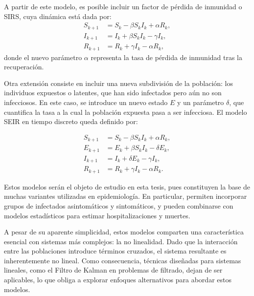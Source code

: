 A partir de este modelo, es posible incluir un factor de pérdida de inmunidad o SIRS, cuya dinámica está dada por:
\begin{equation}
    \begin{aligned}
    S_{k+1} &= S_k -\beta S_k I_k + \alpha R_k, \\
    I_{k+1} &= I_k + \beta S_k I_k - \gamma I_k, \\
    R_{k+1} &= R_k + \gamma I_k - \alpha R_k,
    \end{aligned}
    \label{eq:SIRS}
\end{equation}
donde el nuevo parámetro \(\alpha\) representa la tasa de pérdida de inmunidad tras la recuperación.

Otra extensión consiste en incluir una nueva subdivisión de la población: los individuos expuestos o latentes, que han sido infectados pero aún no son infecciosos. En este caso, se introduce un nuevo estado \(E\) y un parámetro \(\delta\), que cuantifica la tasa a la cual la población expuesta pasa a ser infecciosa. El modelo SEIR en tiempo discreto queda definido por:

\begin{equation}
    \begin{aligned}
        S_{k+1} &= S_k - \beta S_k I_k + \alpha R_k,  \\
        E_{k+1} &= E_k + \beta S_k I_k - \delta E_k,  \\
        I_{k+1} &= I_k + \delta E_k - \gamma I_k, \\
        R_{k+1} &= R_k + \gamma I_k - \alpha R_k.
    \end{aligned}
    \label{eq:SEIR}
\end{equation}

Estos modelos serán el objeto de estudio en esta tesis, pues constituyen la base de muchas variantes utilizadas en epidemiología. En particular, permiten incorporar grupos de infectados asintomáticos y sintomáticos, y pueden combinarse con modelos estadísticos para estimar hospitalizaciones y muertes.

A pesar de su aparente simplicidad, estos modelos comparten una característica esencial con sistemas más complejos: la no linealidad. Dado que la interacción entre las poblaciones introduce términos cruzados, el sistema resultante es inherentemente no lineal. Como consecuencia, técnicas diseñadas para sistemas lineales, como el Filtro de Kalman en problemas de filtrado, dejan de ser aplicables, lo que obliga a explorar enfoques alternativos para abordar estos modelos.